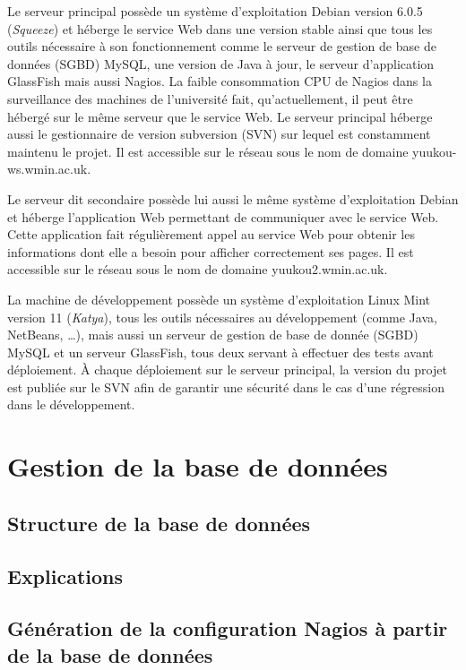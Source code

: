 Le serveur principal poss\`ede un syst\`eme d'exploitation Debian version 6.0.5 (\textit{Squeeze}) et h\'eberge le service Web dans une version stable ainsi que tous les outils n\'ecessaire \`a son fonctionnement comme le serveur de gestion de base de donn\'ees (SGBD) MySQL, une version de Java \`a jour, le serveur d'application GlassFish mais aussi Nagios.
La faible consommation CPU de Nagios dans la surveillance des machines de l'universit\'e fait, qu'actuellement, il peut \^etre h\'eberg\'e sur le m\^eme serveur que le service Web.
Le serveur principal h\'eberge aussi le gestionnaire de version subversion (SVN) sur lequel est constamment maintenu le projet.
Il est accessible sur le r\'eseau sous le nom de domaine \textsf{yuukou-ws.wmin.ac.uk}.

Le serveur dit {\og}secondaire{\fg} poss\`ede lui aussi le m\^eme syst\`eme d'exploitation Debian et h\'eberge l'application Web permettant de communiquer avec le service Web.
Cette application fait r\'eguli\`erement appel au service Web pour obtenir les informations dont elle a besoin pour afficher correctement ses pages.
Il est accessible sur le r\'eseau sous le nom de domaine \textsf{yuukou2.wmin.ac.uk}.

La machine de d\'eveloppement poss\`ede un syst\`eme d'exploitation Linux Mint version 11 (\textit{Katya}), tous les outils n\'ecessaires au d\'eveloppement (comme Java, NetBeans, \ldots), mais aussi un serveur de gestion de base de donn\'ee (SGBD) MySQL et un serveur GlassFish, tous deux servant \`a effectuer des tests avant d\'eploiement.
\`A chaque d\'eploiement sur le serveur principal, la version du projet est publi\'ee sur le SVN afin de garantir une s\'ecurit\'e dans le cas d'une r\'egression dans le d\'eveloppement.


\section{Gestion de la base de donn\'ees}

\subsection{Structure de la base de donn\'ees}



\subsection{Explications}

\subsection{G\'en\'eration de la configuration Nagios \`a partir de la base de donn\'ees}

